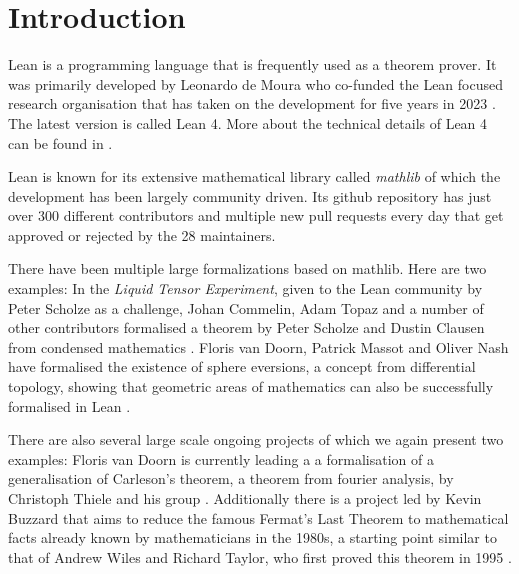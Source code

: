\chapter*{Introduction}

Lean is a programming language that is frequently used as a theorem prover. 
It was primarily developed by Leonardo de Moura who co-funded the Lean focused research organisation that has taken on the development for five years in 2023 \cite{LeanFRO2024}. 
The latest version is called Lean 4.
More about the technical details of Lean 4 can be found in \cite{deMoura2021}.

Lean is known for its extensive mathematical library called \emph{mathlib} of which the development has been largely community driven. 
Its github repository has just over 300 different contributors and multiple new pull requests every day that get approved or rejected by the 28 maintainers. 

There have been multiple large formalizations based on mathlib. 
Here are two examples: 
In the \emph{Liquid Tensor Experiment}, given to the Lean community by Peter Scholze as a challenge, Johan Commelin, Adam Topaz and a number of other contributors formalised a theorem by Peter Scholze and Dustin Clausen from condensed mathematics \cite{Commelin2022}.
Floris van Doorn, Patrick Massot and Oliver Nash have formalised the existence of sphere eversions, a concept from differential topology, showing that geometric areas of mathematics can also be successfully formalised in Lean \cite{vanDoorn2023}. 

There are also several large scale ongoing projects of which we again present two examples: 
Floris van Doorn is currently leading a a formalisation of a generalisation of Carleson's theorem, a theorem from fourier analysis, by Christoph Thiele and his group \cite{Becker2024}.
Additionally there is a project led by Kevin Buzzard that aims to reduce the famous Fermat's Last Theorem to mathematical facts already known by mathematicians in the 1980s, a starting point similar to that of Andrew Wiles and Richard Taylor, who first proved this theorem in 1995 \cite{Buzzard2024}.

